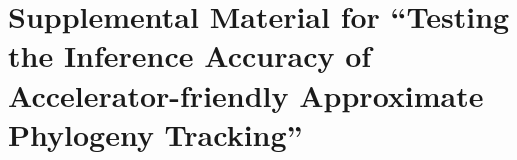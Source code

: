 \section*{Supplemental Material for ``Testing the Inference Accuracy of Accelerator-friendly Approximate Phylogeny Tracking''}





% 

% 
% 
% 

